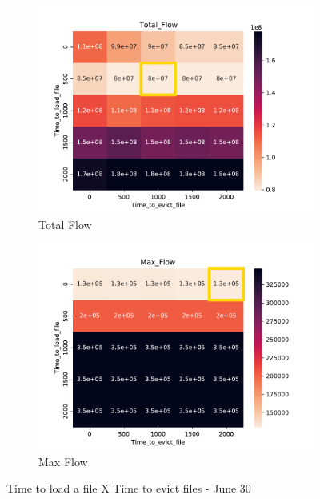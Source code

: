 \documentclass[a4paper]{article}
\begin{document}
\begin{figure}[H]
\begin{subfigure}[b]{0.4\linewidth}\centering\includegraphics[width=1\linewidth]{MBSS/plot/Heatmap_Total_Flow_FCFS_Score_Time_to_load_file_Time_to_evict_file_2022-01-24->2022-01-24_450_128_32_256_4_1024.pdf}\caption{Total Flow}\end{subfigure}
\begin{subfigure}[b]{0.4\linewidth}\centering\includegraphics[width=1\linewidth]{MBSS/plot/Heatmap_Max_Flow_FCFS_Score_Time_to_load_file_Time_to_evict_file_2022-01-24->2022-01-24_450_128_32_256_4_1024.pdf}\caption{Max Flow}\end{subfigure}
\caption{Time to load a file X Time to evict files - June 30}\end{figure}
\end{document}
